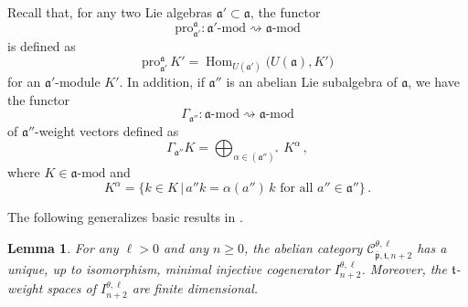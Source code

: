 \documentclass{tglat2e}
\newtheorem{lemma}[theorem]{Lemma}
\theoremstyle{definition}
\theoremstyle{remark}
\renewcommand{\tt}{\mathfrak{t}}
\newcommand{\pp}{\mathfrak{p}}
\DeclareMathOperator{\Hom}{Hom}
\begin{document}
	Recall that, for any two Lie algebras $\mathfrak{a}'\subset \mathfrak{a}$, the functor $$\mathrm{pro}^{\mathfrak{a}}_{\mathfrak{a}'}:\mathfrak{a}'{\text{-mod}}\rightsquigarrow\mathfrak{a}{\text{-mod}}$$ is defined as
	$$\mathrm{pro}^{\mathfrak{a}}_{\mathfrak{a}'}\,K'=\Hom_{U(\mathfrak{a}')}\big(U(\mathfrak{a}),K'\big)$$
	for an $\mathfrak{a}'$-module $K'$.  In addition, if $\mathfrak{a}''$ is an abelian Lie subalgebra of $\mathfrak{a}$, we have the functor $$\Gamma_{\mathfrak{a}''}:\mathfrak{a}{\text{-mod}}\rightsquigarrow\mathfrak{a}{\text{-mod}}$$ of $\mathfrak{a}''$-weight vectors defined as
	$$\Gamma_{\mathfrak{a}''}K=\bigoplus_{\alpha \in (\mathfrak{a}'')^*}\,K^\alpha\,,$$
	where $K\in\mathfrak{a}{\text{-mod}}$ and 
	$$K^\alpha=\Big\{k\in K\,|\,a''k=\alpha(a'')\,k\text{ for all }a''\in\mathfrak{a}''\Big\}\,.$$
	
	
	The following generalizes basic results in \cite{BGG}.
	
	\begin{lemma}
		For any $\ell>0$ and any $n\geq 0$, the abelian category $\mathcal{C}^{\theta,\ell}_{\bar{\pp},\tt,n+2}$ has a unique, 
up to isomorphism, minimal injective cogenerator $I^{\theta,\ell}_{n+2}$.  Moreover, the $\tt$-weight spaces of $I^{\theta,\ell}_{n+2}$ are finite dimensional.
		\label{lem:lemma1}
	\end{lemma}
	
\end{document}
